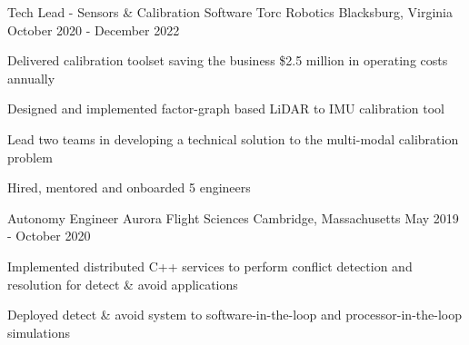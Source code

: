 \begin{cventries}
  \cventry
    {Tech Lead - Sensors \& Calibration Software} %
    {Torc Robotics} %
    {Blacksburg, Virginia} %
    {October 2020 - December 2022} %
    {
      \begin{cvitems}
      \item{Delivered calibration toolset saving the business \$2.5 million in operating costs annually}
      \item{Designed and implemented factor-graph based LiDAR to IMU calibration tool}
      \item{Lead two teams in developing a technical solution to the multi-modal calibration problem}
      \item{Hired, mentored and onboarded 5 engineers}
      \end{cvitems}
    }

  \cventry
    {Autonomy Engineer} %
    {Aurora Flight Sciences} %
    {Cambridge, Massachusetts} %
    {May 2019 - October 2020} %
    {
      \begin{cvitems}
      \item{Implemented distributed C++ services to perform conflict detection and resolution for detect \& avoid applications}
      \item{Deployed detect \& avoid system to software-in-the-loop and processor-in-the-loop simulations}
      \end{cvitems}
    }



\end{cventries}
